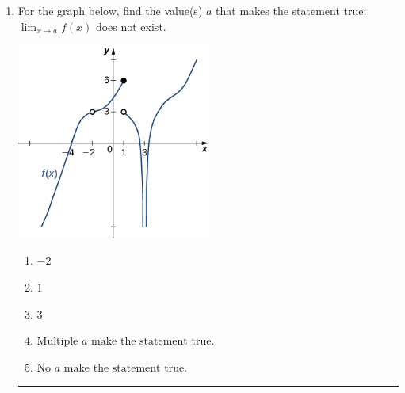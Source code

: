 \documentclass[14pt]{extbook}
\newcommand{\litem}[1]{\item#1\hspace*{-1cm}\rule{\textwidth}{0.4pt}}
\begin{document}
\begin{enumerate}
{\begin{enumerate}[label=\Alph*.]
\end{enumerate} }
\litem{
For the graph below, find the value(s) $a$ that makes the statement true: $ \displaystyle \lim_{x \rightarrow a} f(x)$ does not exist.
\begin{center}
    \includegraphics[width=0.5\textwidth]{../Figures/evaluateLimitGraphicallyA.png}
\end{center}
\begin{enumerate}[label=\Alph*.]
\item \( -2 \)
\item \( 1 \)
\item \( 3 \)
\item \( \text{Multiple } a \text{ make the statement true}. \)
\item \( \text{No } a \text{ make the statement true}. \)

\end{enumerate} }
\end{enumerate}
\end{document}
